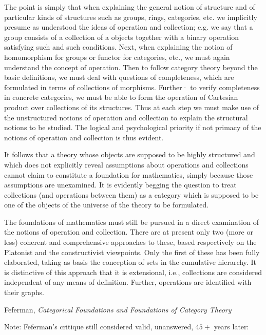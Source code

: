 \documentclass[11pt]{book}
\begin{document}
\epigraph{The point is simply that when explaining the general notion of
structure and of particular kinds of structures such as groups, rings,
categories, etc. we implicitly presume as understood the ideas of
operation and collection; e.g. we say that a group consists of a collection
of a objects together with a binary operation satisfying such and
such conditions. Next, when explaining the notion of homomorphism
for groups or functor for categories, etc., we must again understand the
concept of operation. Then to follow category theory beyond the basic
definitions, we must deal with questions of completeness, which are
formulated in terms of collections of morphisms. Further· to verify
completeness in concrete categories, we must be able to form the
operation of Cartesian product over collections of its structures. Thus
at each step we must make use of the unstructured notions of operation
and collection to explain the structural notions to be studied. The
logical and psychological priority if not primacy of the notions of
operation and collection is thus evident.
\par
It follows that a theory whose objects are supposed to be highly
structured and which does not explicitly reveal assumptions about
operations and collections cannot claim to constitute a foundation for
mathematics, simply because those assumptions are unexamined. It is
evidently begging the question to treat collections (and operations
between them) as a category which is supposed to be one of the objects
of the universe of the theory to be formulated.
\par
The foundations of mathematics must still be pursued in a direct
examination of the notions of operation and collection. There are at
present only two (more or less) coherent and comprehensive approaches
to these, based respectively on the Platonist and the constructivist
viewpoints. Only the first of these has been fully elaborated,
taking as basis the conception of sets in the cumulative hierarchy. It is
distinctive of this approach that it is extensional, i.e., collections are
considered independent of any means of definition. Further, operations
are identified with their graphs.}
{Feferman,
\textit{Categorical Foundations and Foundations of Category 
Theory}~\cite{feferman_1977_categorical}}

\pagebreak

Note: Feferman's critique still considered valid, unanswered,
$45+$ years later:
\end{document}
